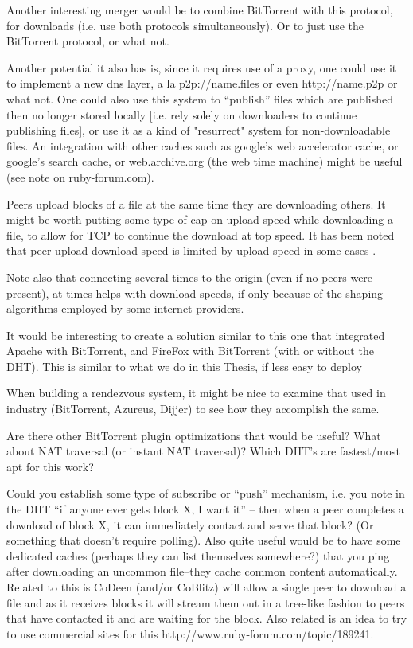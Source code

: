 Another interesting merger would be to combine BitTorrent with this protocol, for downloads (i.e. use both protocols simultaneously).  Or to just use the BitTorrent protocol, or what not.

Another potential it also has is, since it requires use of a proxy, one could use it to implement a new dns layer, a la p2p://name.files or even http://name.p2p or what not.  One could also use this system to ``publish'' files which are published then no longer stored locally [i.e. rely solely on downloaders to continue publishing files], or use it as a kind of "resurrect" system for non-downloadable files.  An integration with other caches such as google's web accelerator cache, or google's search cache, or web.archive.org (the web time machine) might be useful (see note on ruby-forum.com).

Peers upload blocks of a file at the same time they are downloading others.  It might be worth putting some type of cap on upload speed while downloading a file, to allow for TCP to continue the download at top speed.  It has been noted that peer upload download speed is limited by upload speed in some cases \cite{google_note}.

Note also that connecting several times to the origin (even if no peers were present), at times helps with download speeds, if only because of the shaping algorithms employed by some internet providers.

It would be interesting to create a solution similar to this one that integrated Apache with BitTorrent, and FireFox with BitTorrent (with or without the DHT).  This is similar to what we do in this Thesis, if less easy to deploy

When building a rendezvous system, it might be nice to examine that used in industry (BitTorrent, Azureus, Dijjer) to see how they accomplish the same.

Are there other BitTorrent plugin optimizations that would be useful? What about NAT traversal (or instant NAT traversal)?  Which DHT's are fastest/most apt for this work?

Could you establish some type of subscribe or ``push'' mechanism, i.e. you note in the DHT ``if anyone ever gets block X, I want it'' -- then when a peer completes a download of block X, it can immediately contact and serve that block? (Or something that doesn't require polling).  Also quite useful would be to have some dedicated caches (perhaps they can list themselves somewhere?) that you ping after downloading an uncommon file--they cache common content automatically.  Related to this is CoDeen (and/or CoBlitz) will allow a single peer to download a file and as it receives blocks it will stream them out in a tree-like fashion to peers that have contacted it and are waiting for the block.  Also related is an idea to try to use commercial sites for this http://www.ruby-forum.com/topic/189241.

